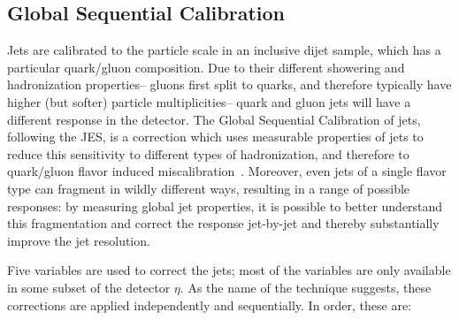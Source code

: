 


\subsection{Global Sequential Calibration}

Jets are calibrated to the particle scale in an inclusive dijet sample, which has a particular quark/gluon composition. Due to their different showering and hadronization properties-- gluons first split to quarks, and therefore typically have higher (but softer) particle multiplicities-- quark and gluon jets will have a different response in the detector. The Global Sequential Calibration of jets, following the JES, is a correction which uses measurable properties of jets to reduce this sensitivity to different types of hadronization, and therefore to quark/gluon flavor induced miscalibration~\cite{ATLAS-GSC}. Moreover, even jets of a single flavor type can fragment in wildly different ways, resulting in a range of possible responses: by measuring global jet properties, it is possible to better understand this fragmentation and correct the response jet-by-jet and thereby substantially improve the jet resolution.

Five variables are used to correct the jets; most of the variables are only available in some subset of the detector $\eta$. As the name of the technique suggests, these corrections are applied independently and sequentially. In order, these are:


